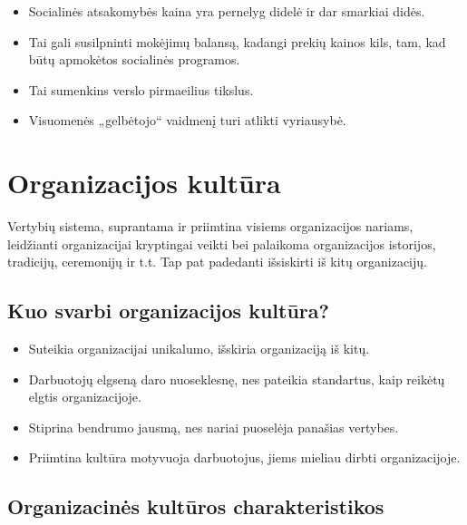 \begin{itemize}
  \item Socialinės atsakomybės kaina yra pernelyg didelė ir dar smarkiai
    didės.
  \item Tai gali susilpninti mokėjimų balansą, kadangi prekių kainos kils,
    tam, kad būtų apmokėtos socialinės programos.
  \item Tai sumenkins verslo pirmaeilius tikslus.
  \item Visuomenės „gelbėtojo“ vaidmenį turi atlikti vyriausybė.
\end{itemize}

\chapter{Organizacijos kultūra}

\begin{defn}
  Vertybių sistema, suprantama ir priimtina visiems organizacijos
  nariams, leidžianti organizacijai kryptingai veikti bei palaikoma
  organizacijos istorijos, tradicijų, ceremonijų ir t.t. Tap pat
  padedanti išsiskirti iš kitų organizacijų.
\end{defn}

\section{Kuo svarbi organizacijos kultūra?}

\begin{itemize}
  \item Suteikia organizacijai unikalumo, išskiria organizaciją iš kitų.
  \item Darbuotojų elgseną daro nuoseklesnę, nes pateikia standartus,
    kaip reikėtų elgtis organizacijoje.
  \item Stiprina bendrumo jausmą, nes nariai puoselėja panašias vertybes.
  \item Priimtina kultūra motyvuoja darbuotojus, jiems mieliau dirbti
    organizacijoje.
\end{itemize}

\section{Organizacinės kultūros charakteristikos}

